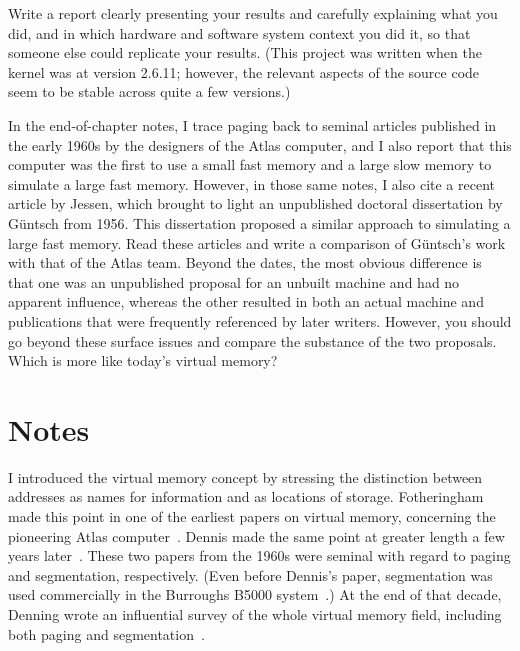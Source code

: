 \begin{chapterEnumerate}
Write a report clearly presenting your results and
carefully explaining what you did, and in which hardware and software
system context you did it, so that someone else could replicate
your results.
(This project was written when the kernel
was at version 2.6.11; however, the relevant aspects of the
source code seem to be stable across quite a few versions.)
\item
\label{guentsch-project}
In the end-of-chapter notes, I trace paging back to seminal articles
published in the early 1960s by the designers of the Atlas computer,
and I also report that this computer was the first to use a small fast
memory and a large slow memory to simulate a large fast memory.
However, in those same notes, I also cite a recent article by
Jessen, which brought to light an unpublished doctoral dissertation by
G{\"u}ntsch from 1956.  This dissertation proposed a similar approach
to simulating a large fast memory.  Read these articles and write a
comparison of G{\"u}ntsch's work with that of the Atlas team.  Beyond
the dates, the most obvious difference is that one was an
unpublished proposal for an unbuilt machine and had no apparent
influence, whereas the other resulted in both an actual machine and
publications that were frequently referenced by later writers.
However, you should go beyond these surface issues and compare the
substance of the two proposals.  Which is more like today's virtual memory?
\end{chapterEnumerate}

\section*{Notes}
I introduced the virtual memory concept by stressing the distinction
between addresses as names for information and as locations of
storage.  Fotheringham made this point in one of the earliest papers
on virtual memory, concerning the pioneering Atlas
computer~\cite{max1052}.  Dennis made the same point at greater length
a few years later~\cite{max1035}.  These two papers from the 1960s
were seminal with regard to paging and segmentation, respectively.  (Even before Dennis's paper, segmentation
was used commercially in the Burroughs B5000 system~\cite{max1194}.)
At
the end of that decade, Denning wrote an influential survey of the
whole virtual memory field, including both paging and
segmentation~\cite{max1018}.

